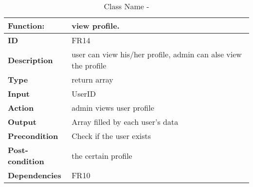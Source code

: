 \documentclass[]{article}
\begin{document}
\FloatBarrier
\begin{table}[h]
\caption{Class Name - }
\label{tab:my-table}
\begin{tabular}{|p{}|p{}|}
\hline
\textbf{Function:} & view profile.
\\ \hline
\textbf{ID}  & FR14         

\\ \hline
\textbf{Description}    & user can view his/her profile, admin can alse view the profile                                                                  
\\ \hline
\textbf{Type}    &  return array       

\\ \hline
\textbf{Input}        & UserID


\\ \hline
\textbf{Action}            & admin views user profile

\\ \hline
\textbf{Output}            & Array filled by each user’s data

\\ \hline
\textbf{Precondition}           & Check if the user exists  

\\ \hline
\textbf{Post-condition}           &  the certain profile


\\ \hline
\textbf{Dependencies}           & FR10
\\ \hline
\end{tabular}
\end{table}
\end{document}

